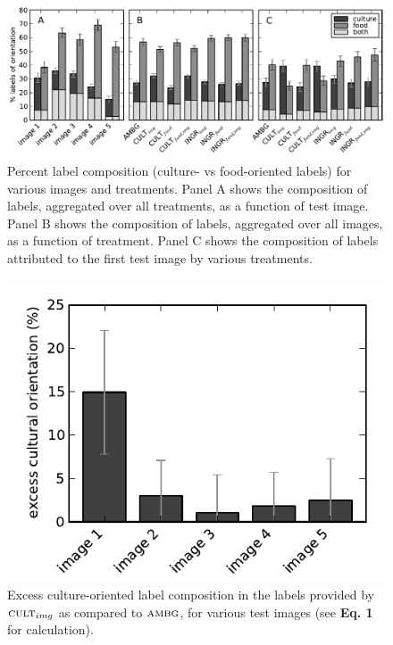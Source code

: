 \documentclass[a4paper]{report}
\begin{document}
\begin{figure}
	\includegraphics{figs/orientationVsTreatment.pdf}
	\caption{Percent label composition (culture- vs food-oriented labels) for 
		various images and treatments.  Panel A shows the composition of 
		labels, aggregated over all treatments, as a function of test image.
		Panel B shows the composition of labels, aggregated over all images, as
		a function of treatment.  Panel C shows the composition of labels 
		attributed to the first test image by various treatments.}
\end{figure}

\begin{figure}
	\includegraphics{figs/excessCultureVsTreatment-t1.pdf}
	\caption{Excess culture-oriented label composition in the labels provided
		by $\textsc{cult}_{img}$ as compared to $\textsc{ambg}$, for various
		test images (see \textbf{Eq. 1} for calculation).
	}
\end{figure}
\end{document}

